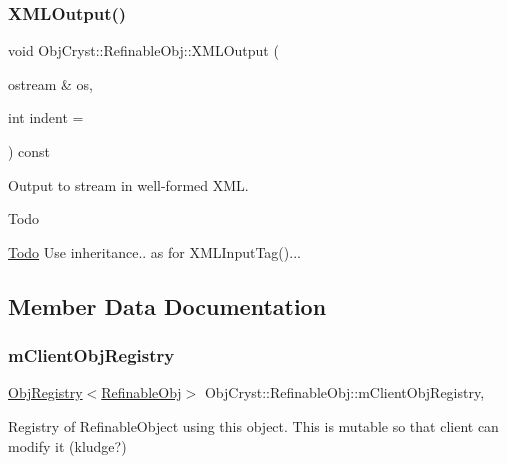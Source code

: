 \subsubsection{\texorpdfstring{XMLOutput()}{XMLOutput()}}
{\footnotesize\ttfamily void Obj\+Cryst\+::\+Refinable\+Obj\+::\+X\+M\+L\+Output (\begin{DoxyParamCaption}\item[{ostream \&}]{os,  }\item[{int}]{indent = {} }\end{DoxyParamCaption}) const\hspace{0.3cm}{\ttfamily [virtual]}}



Output to stream in well-\/formed X\+ML. 

\begin{DoxyRefDesc}{Todo}
\item[\mbox{\hyperlink{todo__todo000007}{Todo}}]Use inheritance.. as for X\+M\+L\+Input\+Tag()... \end{DoxyRefDesc}


\subsection{Member Data Documentation}
\mbox{\label{class_obj_cryst_1_1_refinable_obj_abe0324d0b4bbd15ee9134412b98f55c3}} 
\subsubsection{\texorpdfstring{mClientObjRegistry}{mClientObjRegistry}}
{\footnotesize\ttfamily \mbox{\hyperlink{class_obj_cryst_1_1_obj_registry}{Obj\+Registry}}$<$\mbox{\hyperlink{class_obj_cryst_1_1_refinable_obj}{Refinable\+Obj}}$>$ Obj\+Cryst\+::\+Refinable\+Obj\+::m\+Client\+Obj\+Registry\hspace{0.3cm}{\ttfamily [mutable]}, {\ttfamily [protected]}}

Registry of Refinable\+Object using this object. This is mutable so that client can modify it (kludge?) \mbox{\label{class_obj_cryst_1_1_refinable_obj_acbb5e80371ef0c72ef1bd8559226ae22}} 
